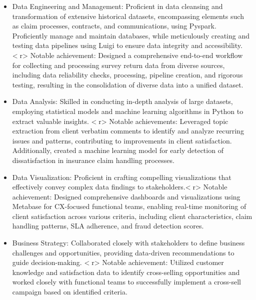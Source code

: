 \documentclass[10pt,letter,ragged2e,withhyper]{altacv}
\begin{document}
\begin{paracol}{2}



\begin{itemize}
  \item Data Engineering and Management: Proficient in data cleansing and transformation of extensive historical datasets, encompassing elements such as claim processes, contracts, and communications, using Pyspark. Proficiently manage and maintain databases, while meticulously creating and testing data pipelines using Luigi to ensure data integrity and accessibility. \textless{}r\textgreater{} Notable achievement: Designed a comprehensive end-to-end workflow for collecting and processing survey return data from diverse sources, including data reliability checks, processing, pipeline creation, and rigorous testing, resulting in the consolidation of diverse data into a unified dataset.
  \item Data Analysis: Skilled in conducting in-depth analysis of large datasets, employing statistical models and machine learning algorithms in Python to extract valuable insights. \textless{}r\textgreater{} Notable achievements: Leveraged topic extraction from client verbatim comments to identify and analyze recurring issues and patterns, contributing to improvements in client satisfaction. Additionally, created a machine learning model for early detection of dissatisfaction in insurance claim handling processes.
  \item Data Visualization: Proficient in crafting compelling visualizations that effectively convey complex data findings to stakeholders.\textless{}r\textgreater{} Notable achievement: Designed comprehensive dashboards and visualizations using Metabase for CX-focused functional teams, enabling real-time monitoring of client satisfaction across various criteria, including client characteristics, claim handling patterns, SLA adherence, and fraud detection scores.
  \item Business Strategy: Collaborated closely with stakeholders to define business challenges and opportunities, providing data-driven recommendations to guide decision-making. \textless{}r\textgreater{} Notable achievement: Utilized customer knowledge and satisfaction data to identify cross-selling opportunities and worked closely with functional teams to successfully implement a cross-sell campaign based on identified criteria.

\end{itemize}
\end{paracol}
\end{document}
